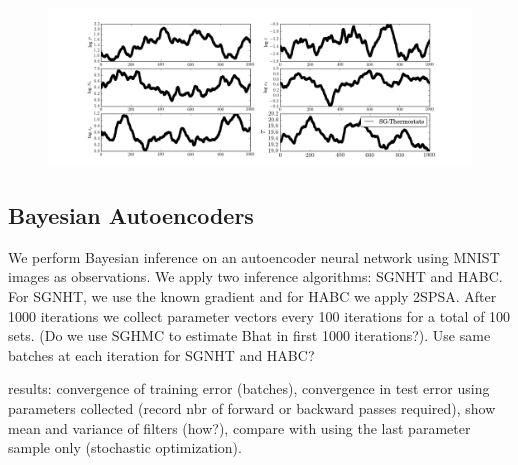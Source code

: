 \documentclass[]{article}
\begin{document}
\begin{figure}[t]
\vskip 0.2in
\begin{center}
\includegraphics[width=1.1\columnwidth]{./images/blowfly/bf_theta_thermo_timeseries.png}
\caption{\small{}}
\label{fig:exp-posteriors}
\end{center}
\vskip -0.2in
\end{figure} 



\subsection{Bayesian Autoencoders}\label{sec:auto}
We perform Bayesian inference on an autoencoder neural network using MNIST images as observations.  We apply two inference algorithms: SGNHT and HABC.  For SGNHT, we use the known gradient and for HABC we apply 2SPSA.  After 1000 iterations we collect parameter vectors every 100 iterations for a total of 100 sets. (Do we use SGHMC to estimate Bhat in first 1000 iterations?).  Use same batches at each iteration for SGNHT and HABC? 

results: convergence of training error (batches), convergence in test error using parameters collected (record nbr of forward or backward passes required), show mean and variance of filters (how?), compare with using the last parameter sample only (stochastic optimization).





\end{document}
